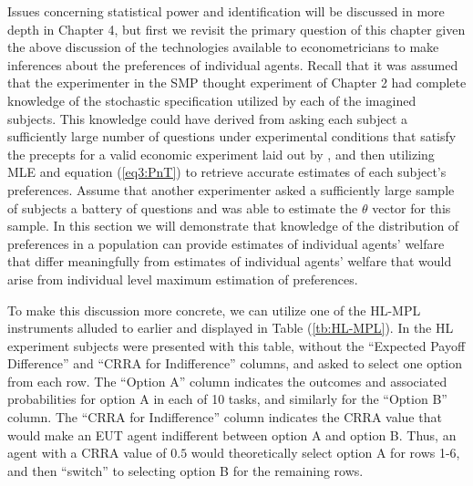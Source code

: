 \documentclass[../main.tex]{subfiles}
\begin{document}
Issues concerning statistical power and identification will be discussed in more depth in Chapter 4, but first we revisit the primary question of this chapter given the above discussion of the technologies available to econometricians to make inferences about the preferences of individual agents.
Recall that it was assumed that the experimenter in the SMP thought experiment of Chapter 2 had complete knowledge of the stochastic specification utilized by each of the imagined subjects.
This knowledge could have derived from asking each subject a sufficiently large number of questions under experimental conditions that satisfy the precepts for a valid economic experiment laid out by \textcite{Smith1982}{\footnotemark}, and then utilizing MLE and equation (\ref{eq3:PnT}) to retrieve accurate estimates of each subject's preferences.
Assume that another experimenter asked a sufficiently large sample of subjects a battery of questions and was able to estimate the $\theta$ vector for this sample.
In this section we will demonstrate that knowledge of the distribution of preferences in a population can provide estimates of individual agents' welfare that differ meaningfully from estimates of individual agents' welfare that would arise from individual level maximum estimation of preferences.

\addtocounter{footnote}{-1}

To make this discussion more concrete, we can utilize one of the HL-MPL instruments alluded to earlier and displayed in Table (\ref{tb:HL-MPL}).
In the HL experiment subjects were presented with this table, without the \enquote{Expected Payoff Difference} and \enquote{CRRA for Indifference} columns, and asked to select one option from each row.
The \enquote{Option A} column indicates the outcomes and associated probabilities for option A in each of 10 tasks, and similarly for the \enquote{Option B} column.
The \enquote{CRRA for Indifference} column indicates the CRRA value that would make an EUT agent indifferent between option A and option B.
Thus, an agent with a CRRA value of $0.5$ would theoretically select option A for rows 1-6, and then \enquote{switch} to selecting option B for the remaining rows.
\end{document}
